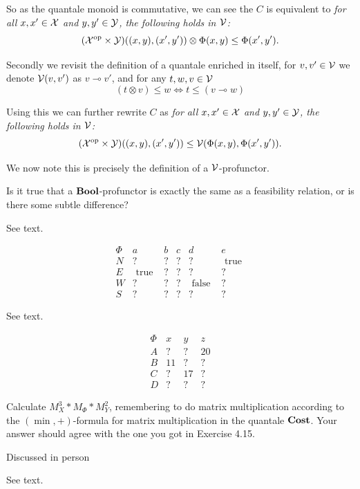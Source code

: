 So as the quantale monoid is commutative, we can see the $C$ is equivalent to \textit{for all $x,x'\in\mathcal{X}$ and $y,y'\in\mathcal{Y}$, the following holds in $\mathcal{V}$:}
$$(\mathcal{X}^{\textrm{op}}\times\mathcal{Y})((x,y),(x',y'))\otimes\Phi(x,y)\leq\Phi(x',y').$$

Secondly we revisit the definition of a quantale enriched in itself, for $v,v'\in \mathcal{V}$ we denote $\mathcal{V}(v,v')$ as  $v\multimap v'$, and for any $t,w,v\in \mathcal{V}$
 $$(t\otimes v)\leq w \iff t\leq (v\multimap w)$$
 
Using this we can further rewrite $C$ as \textit{for all $x,x'\in\mathcal{X}$ and $y,y'\in\mathcal{Y}$, the following holds in $\mathcal{V}$:}
$$(\mathcal{X}^{\textrm{op}}\times\mathcal{Y})((x,y),(x',y'))\leq\mathcal{V}(\Phi(x,y),\Phi(x',y')).$$

We now note this is precisely the definition of a $\mathcal{V}$-profunctor.

Is it true that a $\textbf{Bool}$-profunctor is exactly the same as a feasibility relation, or is there some subtle difference?

\solution

See text.

\solution
$$\begin{array}{c|ccccc}
\Phi & a & b & c & d & e \\
\hline N & ? & ? & ? & ? & \text { true } \\
E & \text { true } & ? & ? & ? & ? \\
W & ? & ? & ? & \text { false } & ? \\
S & ? & ? & ? & ? & ?
\end{array}$$

See text.

\solution
$$\begin{array}{c|ccc}
\Phi & x & y & z \\
\hline A & ? & ? & 20 \\
B & 11 & ? & ? \\
C & ? & 17 & ? \\
D & ? & ? & ?
\end{array}$$

Calculate $M_X^3*M_\Phi*M_Y^2$, remembering to do matrix multiplication according to the $(\min,+)$-formula for matrix multiplication in the quantale $\textbf{Cost}$.  Your answer should agree with the one you got in Exercise 4.15.

\solution

Discussed in person

See text.

